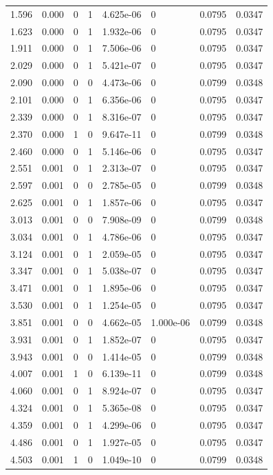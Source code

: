 \documentclass[preview]{standalone}
\begin{document}
{{\begin{tabular}{L{1.2cm}C{1.2cm} C{0.3cm}C{0.5cm} C{1.4cm}C{1.4cm} C{1.4cm}C{1.4cm}}
  1.596  &  0.000  & 0     &  1 &  4.625e-06  & 0  & 0.0795 &  0.0347   \\ 
  1.623  &  0.000  & 0     &  1 &  1.932e-06  & 0  & 0.0795 &  0.0347   \\ 
  1.911  &  0.000  & 0     &  1 &  7.506e-06  & 0  & 0.0795 &  0.0347   \\ 
  2.029  &  0.000  & 0     &  1 &  5.421e-07  & 0  & 0.0795 &  0.0347   \\ 
  2.090  &  0.000  & 0     &  0 &  4.473e-06  & 0  & 0.0799 &  0.0348   \\ 
  2.101  &  0.000  & 0     &  1 &  6.356e-06  & 0  & 0.0795 &  0.0347   \\ 
  2.339  &  0.000  & 0     &  1 &  8.316e-07  & 0  & 0.0795 &  0.0347   \\ 
  2.370  &  0.000  & 1     &  0 &  9.647e-11  & 0  & 0.0799 &  0.0348   \\ 
  2.460  &  0.000  & 0     &  1 &  5.146e-06  & 0  & 0.0795 &  0.0347   \\ 
  2.551  &  0.001  & 0     &  1 &  2.313e-07  & 0  & 0.0795 &  0.0347   \\ 
  2.597  &  0.001  & 0     &  0 &  2.785e-05  & 0  & 0.0799 &  0.0348   \\ 
  2.625  &  0.001  & 0     &  1 &  1.857e-06  & 0  & 0.0795 &  0.0347   \\ 
  3.013  &  0.001  & 0     &  0 &  7.908e-09  & 0  & 0.0799 &  0.0348   \\ 
  3.034  &  0.001  & 0     &  1 &  4.786e-06  & 0  & 0.0795 &  0.0347   \\ 
  3.124  &  0.001  & 0     &  1 &  2.059e-05  & 0  & 0.0795 &  0.0347   \\ 
  3.347  &  0.001  & 0     &  1 &  5.038e-07  & 0  & 0.0795 &  0.0347   \\ 
  3.471  &  0.001  & 0     &  1 &  1.895e-06  & 0  & 0.0795 &  0.0347   \\ 
  3.530  &  0.001  & 0     &  1 &  1.254e-05  & 0  & 0.0795 &  0.0347   \\ 
  3.851  &  0.001  & 0     &  0 &  4.662e-05  & 1.000e-06  & 0.0799 &  0.0348   \\ 
  3.931  &  0.001  & 0     &  1 &  1.852e-07  & 0  & 0.0795 &  0.0347   \\ 
  3.943  &  0.001  & 0     &  0 &  1.414e-05  & 0  & 0.0799 &  0.0348   \\ 
  4.007  &  0.001  & 1     &  0 &  6.139e-11  & 0  & 0.0799 &  0.0348   \\ 
  4.060  &  0.001  & 0     &  1 &  8.924e-07  & 0  & 0.0795 &  0.0347   \\ 
  4.324  &  0.001  & 0     &  1 &  5.365e-08  & 0  & 0.0795 &  0.0347   \\ 
  4.359  &  0.001  & 0     &  1 &  4.299e-06  & 0  & 0.0795 &  0.0347   \\ 
  4.486  &  0.001  & 0     &  1 &  1.927e-05  & 0  & 0.0795 &  0.0347   \\ 
  4.503  &  0.001  & 1     &  0 &  1.049e-10  & 0  & 0.0799 &  0.0348   \\ 
\hline 
\end{tabular} 

}}
\end{document}
